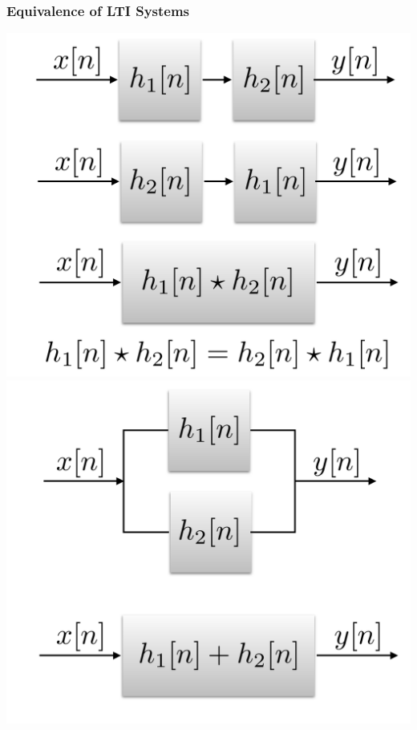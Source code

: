 \documentclass[mathserif,9pt,handout]{beamer}
\begin{document}
\begin{frame}\frametitle{Equivalence of LTI Systems}\small
  \begin{center}
    \includegraphics[height=.45\textheight]{lti_sys_00.pdf} \hspace{2em}
    \includegraphics[height=.45\textheight]{lti_sys_01.pdf}
  \end{center}
\end{frame}
\end{document}
